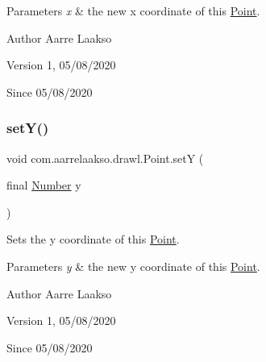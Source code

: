 \begin{DoxyParams}{Parameters}
{\em x} & the new x coordinate of this \hyperlink{classcom_1_1aarrelaakso_1_1drawl_1_1_point}{Point}. \\
\hline
\end{DoxyParams}
\begin{DoxyAuthor}{Author}
Aarre Laakso 
\end{DoxyAuthor}
\begin{DoxyVersion}{Version}
1, 05/08/2020 
\end{DoxyVersion}
\begin{DoxySince}{Since}
05/08/2020 
\end{DoxySince}
\mbox{\label{classcom_1_1aarrelaakso_1_1drawl_1_1_point_a713f16e843349993ac2b79bc05b5aeb6}} 
\subsubsection{\texorpdfstring{set\+Y()}{setY()}}
{\footnotesize\ttfamily void com.\+aarrelaakso.\+drawl.\+Point.\+setY (\begin{DoxyParamCaption}\item[{final \hyperlink{interfacecom_1_1aarrelaakso_1_1drawl_1_1_number}{Number}}]{y }\end{DoxyParamCaption})\hspace{0.3cm}{\ttfamily [package]}}



Sets the y coordinate of this \hyperlink{classcom_1_1aarrelaakso_1_1drawl_1_1_point}{Point}. 


\begin{DoxyParams}{Parameters}
{\em y} & the new y coordinate of this \hyperlink{classcom_1_1aarrelaakso_1_1drawl_1_1_point}{Point}. \\
\hline
\end{DoxyParams}
\begin{DoxyAuthor}{Author}
Aarre Laakso 
\end{DoxyAuthor}
\begin{DoxyVersion}{Version}
1, 05/08/2020 
\end{DoxyVersion}
\begin{DoxySince}{Since}
05/08/2020 
\end{DoxySince}


